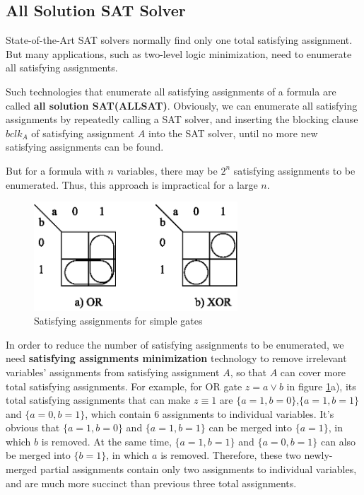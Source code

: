 \documentclass[journal]{IEEEtran}
\begin{document}
%
%


\subsection{All Solution SAT Solver}\label{subsec_ALLSAT}

State-of-the-Art SAT solvers normally find only one total satisfying assignment.
But many applications,
such as two-level logic minimization\cite{SATLOGICMIN},
need to enumerate all satisfying assignments.

Such technologies that enumerate all satisfying assignments of a formula are called \textbf{all solution SAT(ALLSAT)}.
Obviously,
we can enumerate all satisfying assignments by repeatedly calling a SAT solver,
and inserting the blocking clause $bclk_A$ of satisfying assignment $A$ into the SAT solver,
until no more new satisfying assignments can be found.

But for a formula with $n$ variables,
there may be $2^n$ satisfying assignments to be enumerated.
Thus, this approach is impractical for a large $n$.

\begin{figure}[!t]
\centering
\includegraphics[width=3in]{minterm}
\caption{Satisfying assignments for simple gates}
\label{ORXOR}
\end{figure}

In order to reduce the number of satisfying assignments to be enumerated,
we need \textbf{satisfying assignments minimization} technology to remove irrelevant variables' assignments from satisfying assignment $A$,
so that $A$ can cover more total satisfying assignments.
For example, for OR gate $z= a\vee b$ in figure \ref{ORXOR}a),
its total satisfying assignments that can make $z\equiv 1$ are $\{a= 1, b= 0\}$,$\{a= 1, b= 1\}$ and $\{a= 0, b= 1\}$,
which contain 6 assignments to individual variables.
It's obvious that $\{a= 1, b= 0\}$ and $\{a= 1, b= 1\}$ can be merged into $\{a= 1\}$, in which $b$ is removed.
At the same time,
$\{a= 1, b= 1\}$ and $\{a= 0, b= 1\}$ can also be merged into $\{b= 1\}$, in which $a$ is removed.
Therefore,
these two newly-merged partial assignments contain only two assignments to individual variables,
and are much more succinct than previous three total assignments.
\end{document}
